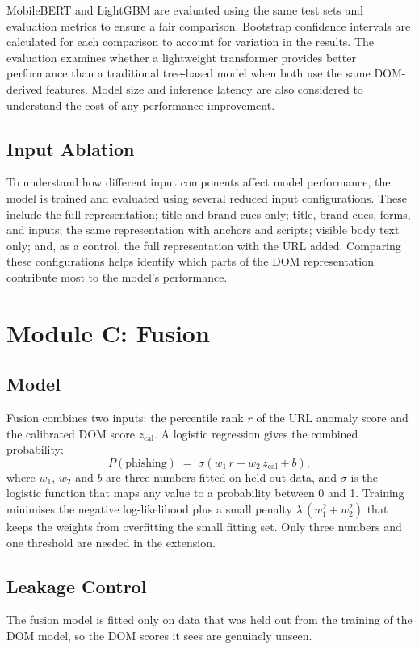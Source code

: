 \documentclass{FastFyp}
\begin{document}
MobileBERT and LightGBM are evaluated using the same test sets and evaluation metrics to ensure a fair comparison. Bootstrap confidence intervals are calculated for each comparison to account for variation in the results. The evaluation examines whether a lightweight transformer provides better performance than a traditional tree-based model when both use the same DOM-derived features. Model size and inference latency are also considered to understand the cost of any performance improvement.

\subsection{Input Ablation}

To understand how different input components affect model performance, the model is trained and evaluated using several reduced input configurations. These include the full representation; title and brand cues only; title, brand cues, forms, and inputs; the same representation with anchors and scripts; visible body text only; and, as a control, the full representation with the URL added. Comparing these configurations helps identify which parts of the DOM representation contribute most to the model's performance.

\section{Module C: Fusion}
\label{sec:fusion}

\subsection{Model}
Fusion combines two inputs: the percentile rank $r$ of the URL anomaly score and the calibrated DOM score $z_{\mathrm{cal}}$. A logistic regression gives the combined probability:
\begin{equation}
P(\text{phishing}) \;=\; \sigma\!\left(w_1\, r + w_2\, z_{\mathrm{cal}} + b\right),
\end{equation}
where $w_1$, $w_2$ and $b$ are three numbers fitted on held-out data, and $\sigma$ is the logistic function that maps any value to a probability between 0 and 1. Training minimises the negative log-likelihood plus a small penalty $\lambda\,(w_1^2 + w_2^2)$ that keeps the weights from overfitting the small fitting set. Only three numbers and one threshold are needed in the extension.

\subsection{Leakage Control}
The fusion model is fitted only on data that was held out from the training of the DOM model, so the DOM scores it sees are genuinely unseen.
\end{document}
